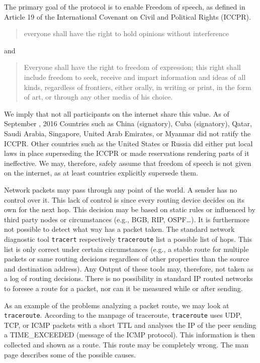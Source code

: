 The primary goal of the protocol is to enable Freedom of speech, as defined in Article 19 of the International Covenant on Civil and Political Rights (ICCPR)\cite{iccpr}.
\begin{quote}
	everyone shall have the right to hold opinions without interference 
\end{quote}
and
\begin{quote}
	Everyone shall have the right to freedom of expression; this right shall include freedom to seek, receive and impart information and ideas of all kinds, regardless of frontiers, either orally, in writing or print, in the form of art, or through any other media of his choice.
\end{quote}

We imply that not all participants on the internet share this value. As of September , 2016 Countries such as China (signatory), Cuba (signatory), Qatar, Saudi Arabia, Singapore, United Arab Emirates, or Myanmar did not ratify the ICCPR. Other countries such as the United States or Russia did either put local laws in place superseding the ICCPR or made reservations rendering parts of it ineffective. We may, therefore, safely assume that freedom of speech is not given on the internet, as at least countries explicitly supersede them.

Network packets may pass through any point of the world. A sender has no control over it. This lack of control is since every routing device decides on its own for the next hop. This decision may be based on static rules or influenced by third party nodes or circumstances (e.g., BGB, RIP, OSPF\ldots). It is furthermore not possible to detect what way has a packet taken. The standard network diagnostic tool \verb|tracert| respectively \verb|traceroute| list a possible list of hops. This list is only correct under certain circumstances (e.g., a stable route for multiple packets or same routing decisions regardless of other properties than the source and destination address). Any Output of these tools may, therefore, not taken as a log of routing decisions. There is no possibility in standard IP routed networks to foresee a route for a packet, nor can it be measured while or after sending. 

As an example of the problems analyzing a packet route, we may look at \verb|traceroute|. According to the manpage of traceroute, \verb|traceroute| uses UDP, TCP, or ICMP packets with a short TTL and analyses the IP of the peer sending a TIME\_EXCEEDED (message of the ICMP protocol). This information is then collected and shown as a route. This route may be completely wrong. The man page describes some of the possible causes.

